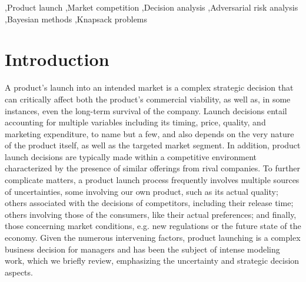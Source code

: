 \documentclass[a4paper,fleqn, 11pt]{cas-sc}
\begin{document}
\begin{keywords}
 \sep Product launch  \sep Market competition \sep Decision analysis \sep Adversarial risk
analysis \sep Bayesian methods \sep Knapsack problems
\end{keywords}

\maketitle


\section{Introduction}\label{sec:intro}
 A product’s launch into an intended market is a complex strategic decision that can critically affect both the product’s commercial viability, as well as, in some instances, even the long-term survival of the company. Launch decisions entail accounting for multiple variables including its timing, price, quality, and marketing expenditure, to name but a few, and also depends on the very nature of the product itself, as well as the targeted market segment. In addition, product launch decisions are typically made within a competitive environment characterized by the presence of similar offerings from rival companies. %
     To further complicate matters, a product launch process frequently involves multiple sources of uncertainties, some involving our own product, such as its actual quality; others associated with the decisions of competitors, including their release time; others involving those of the consumers, like their actual preferences; and finally, those concerning market conditions, e.g. new regulations or the future state of the economy.  Given the numerous intervening factors, product launching is a complex business decision for managers and has been the subject of intense modeling work, which we briefly review, emphasizing the uncertainty and strategic decision aspects.
\end{document}
